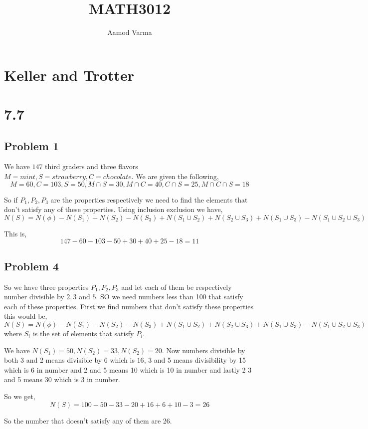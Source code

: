 \documentclass[a4paper]{report}
\title{MATH3012}
\author{Aamod Varma}
\begin{document}
\maketitle




\section*{Keller and Trotter}
\section*{7.7}
\subsection*{Problem 1}
We have $147$ third graders and three flavors $M = mint, S = strawberry, C = chocolate$. We are given the following,  
$$ M = 60, C= 103, S=50, M \cap S = 30, M \cap C = 40, C \cap S = 25, M \cap C \cap S = 18 $$

So if $P_1, P_2, P_3$ are the properties respectively we need to find the elements that don't satisfy any of these properties. Using inclusion exclusion we have,  
$$ N(S)  = N(\phi) - N(S_1) - N(S_2) - N(S_3) + N(S_1 \cup S_2) + N(S_2 \cup S_3) + N(S_1 \cup S_3) - N(S_1 \cup S_2 \cup S_3)$$ 

This is, 
$$ 147 - 60 - 103 - 50 + 30 + 40 + 25 - 18 = 11$$ 

\subsection*{Problem 4}
So we have three properties $P_1, P_2, P_3$ and let each of them be respectively number divisible by $2,3$ and  $5$. SO we need numbers less than 100 that satisfy each of these properties. First we find numbers that don't satisfy these properties this would be,
$$ N(S)  = N(\phi) - N(S_1) - N(S_2) - N(S_3) + N(S_1 \cup S_2) + N(S_2 \cup S_3) + N(S_1 \cup S_3) - N(S_1 \cup S_2 \cup S_3)$$ 
where $S_i$ is the set of elements that satisfy  $P_i$.

 We have $N(S_1) = 50, N(S_2) = 33, N(S_2) = 20$. Now numbers divisible by both 3 and 2 means divisible by 6 which is $16$, 3 and 5 means divisibility by 15 which is 6 in number and 2 and 5 means 10 which is 10 in number and lastly 2 3 and 5 means 30 which is 3 in number.

 So we get,  
 $$ N(S) = 100 - 50 - 33- 20 + 16 + 6 + 10 - 3 = 26 $$ 

 So the number that doesn't satisfy any of them are 26.
\end{document}
